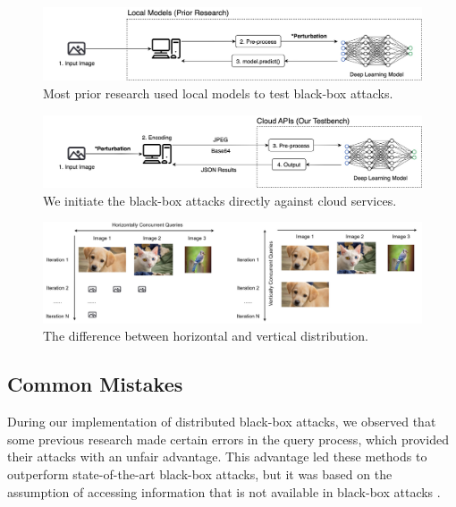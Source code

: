 \begin{figure}[btph]
    \centering
    \includegraphics[width=0.9\linewidth]{figures/chapter_classification/local.jpg}
    \caption{Most prior research used local models to test black-box attacks.}
    \label{fig:local}
\end{figure}

\begin{figure}[btph]
    \centering
    \includegraphics[width=0.9\linewidth]{figures/chapter_classification/cloudapi.jpg}
    \caption{We initiate the black-box attacks directly against cloud services.}
    \label{fig:cloudapi}
\end{figure}

\begin{figure}[btph]
    \centering
    \includegraphics[width=0.9\linewidth]{figures/chapter_classification/distribution.jpg}
    \caption{The difference between horizontal and vertical distribution.}
    \label{fig:distributability}
\end{figure}

\subsection{Common Mistakes}
\label{common_errors}


During our implementation of distributed black-box attacks, we observed that some previous research made certain errors in the query process, which provided their attacks with an unfair advantage. This advantage led these methods to outperform state-of-the-art black-box attacks, but it was based on the assumption of accessing information that is not available in black-box attacks \citep{ilyas2018black}\citep{ilyas2018prior}\citep{guo2019simple}\citep{Brunner_2019}\citep{moon2019parsimonious}\citep{andriushchenko2020square}.

